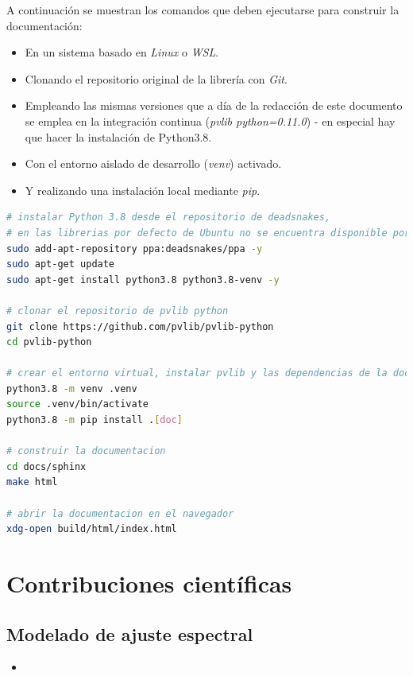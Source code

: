 A continuación se muestran los comandos que deben ejecutarse para construir la documentación:

\begin{itemize}
    \item En un sistema basado en \textit{Linux} o \textit{WSL}.
    \item Clonando el repositorio original de la librería con \textit{Git}.
    \item Empleando las mismas versiones que a día de la redacción de este documento se emplea en la integración continua (\textit{pvlib python=0.11.0}) - en especial hay que hacer la instalación de Python3.8.
    \item Con el entorno aislado de desarrollo (\textit{venv}) activado.
    \item Y realizando una instalación local mediante \textit{pip}.
\end{itemize}

\begin{lstlisting}[language=bash]
# instalar Python 3.8 desde el repositorio de deadsnakes,
# en las librerias por defecto de Ubuntu no se encuentra disponible por antiguedad
sudo add-apt-repository ppa:deadsnakes/ppa -y
sudo apt-get update
sudo apt-get install python3.8 python3.8-venv -y

# clonar el repositorio de pvlib python
git clone https://github.com/pvlib/pvlib-python
cd pvlib-python

# crear el entorno virtual, instalar pvlib y las dependencias de la documentacion
python3.8 -m venv .venv
source .venv/bin/activate
python3.8 -m pip install .[doc]

# construir la documentacion
cd docs/sphinx
make html

# abrir la documentacion en el navegador
xdg-open build/html/index.html
\end{lstlisting}

\section{Contribuciones científicas} \label{sct:desarrollo:contribuciones_cientificas}

\subsection{Modelado de ajuste espectral}

\begin{itemize}
    \item {}
\end{itemize}

